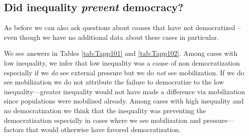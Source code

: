 \documentclass[
  12pt,
]{book}
\begin{document}
\begin{table}

\caption{\label{tab:HK10cases2}Four cases with high inequality and  democratization. Question of interest: Was high inequality a cause of democratization? Table shows posterior beliefs for different data for 4 cases given information on $M$ or $P$. Data from Haggard and Kaufman (2012).  Analyses here use a model with assumptions on monotonic effects but magnitudes of effects updated from data.r}
\centering
{}
\end{table}

\hypertarget{did-inequality-prevent-democracy}{%
\subsection{\texorpdfstring{Did inequality \emph{prevent} democracy?}{Did inequality prevent democracy?}}\label{did-inequality-prevent-democracy}}

As before we can also ask questions about causes that have not democratized -- even though we have no additional data about these cases in particular.

We see answers in Tables \ref{tab:Tapp101} and \ref{tab:Tapp102}. Among cases with low inequality, we infer that low inequality was a cause of non democratization especially if we \emph{do} see external pressure but we do \emph{not} see mobilization. If we do see mobilization we do not attribute the failure to democratize to the low inequality---greater inequality would not have made a difference via mobilization since populations were mobilized already. Among cases with high inequality and no democratization we think that the inequality was preventing the democratization especially in cases where we see mobilization and pressure---factors that would otherwise have favored democratization.
\end{document}
